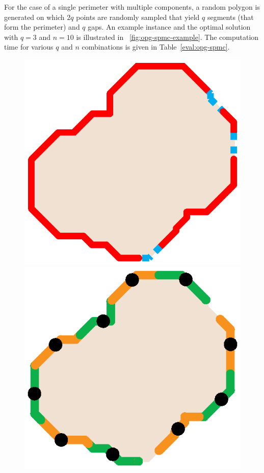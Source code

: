 For the case of a single perimeter with multiple components, a random 
polygon is generated on which $2q$ points are randomly sampled that 
yield $q$ segments (that form the perimeter) and $q$ gaps. An example 
instance and the optimal solution with $q=3$ and $n = 10$ is illustrated 
in ~\ref{fig:opg-spmc-example}. The computation time for various $q$ and 
$n$ combinations is given in Table~\ref{eval:opg-spmc}.
\begin{figure}[ht!]
    \centering
    \includegraphics[keepaspectratio, scale=0.4]{./chapters/opg/figures/spmc-example.eps}
    \includegraphics[keepaspectratio, scale=0.4]{./chapters/opg/figures/spmc-solution.eps}

\end{figure}
